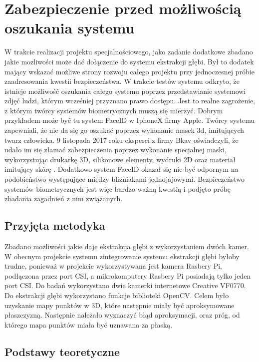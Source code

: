 \documentclass[oneside, eng]{mgr}
\begin{document}
\newpage

\chapter{Zabezpieczenie przed możliwością oszukania systemu}

W trakcie realizacji projektu specjalnościowego, jako zadanie dodatkowe zbadano jakie mozliwości może dać dołączenie do systemu ekstrakcji głębi. Był to dodatek mający wskazać możliwe strony rozwoju całego projektu przy jednoczesnej próbie zaadresowania kwestii bezpieczeństwa. W trakcie testów systemu odkryto, że istnieje możliwość oszukania całego systemu poprzez przedstawianie systemowi zdjęć ludzi, którym wcześniej przyznano prawo dostępu. Jest to realne zagrożenie, z którym twórcy systemów biometrycznych muszą się mierzyć. Dobrym przykładem może być tu system FaceID w IphoneX firmy Apple. Twórcy systemu zapewniali, że nie da się go oszukać poprzez wykonanie masek 3d, imitujących twarz człowieka. 9 listopada 2017 roku eksperci z firmy Bkav oświadczyli, że udało im się złamać zabezpieczenia poprzez wykonanie specjalnej maski, wykorzystując drukarkę 3D, silikonowe elementy, wydruki 2D oraz materiał imitujący skórę \cite{FaceID hacked}. Dodatkowo system FaceID okazał się nie być odpornym na podobieństwo występujące między bliźniakami jednojajowymi. Bezpieczeństwo systemów biometrycznych jest więc bardzo ważną kwestią i podjęto próbę zbadania zagadnień z nim związanych.

\section{Przyjęta metodyka}
Zbadano możliwości jakie daje ekstrakcja głębi z wykorzystaniem dwóch kamer. W obecnym projekcie systemu zintegrowanie systemu ekstrakcji głębi byłoby trudne, ponieważ w projekcie wykorzystywana jest kamera Rasbery Pi, podłączona przez port CSI, a mikrokomputery Rasbery Pi posiadają tylko jeden port CSI. Do badań wykorzystano dwie kamerki internetowe Creative VF0770. Do ekstrakcji głębi wykorzystano funkcje biblioteki OpenCV. Celem było uzyskanie mapy punktów w 3D, które następnie miały być aproksymowane płaszczyzną. Następnie należało wyznaczyć błąd aproksymacji, oraz próg, od którego mapa punktów miała być uznawana za płaską.

\section{Podstawy teoretyczne}
\end{document}
